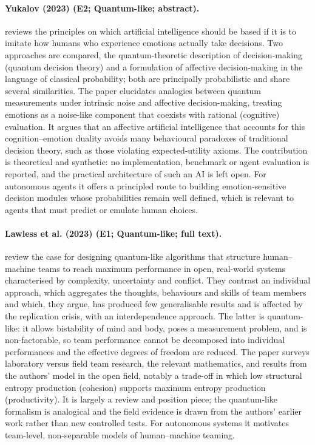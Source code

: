 \documentclass[10pt,a4paper]{article}
\begin{document}
\paragraph{Yukalov (2023) (E2; Quantum-like; abstract).} \citet{Yukalov2023} reviews the principles on which artificial intelligence should be based if it is to imitate how humans who experience emotions actually take decisions. Two approaches are compared, the quantum-theoretic description of decision-making (quantum decision theory) and a formulation of affective decision-making in the language of classical probability; both are principally probabilistic and share several similarities. The paper elucidates analogies between quantum measurements under intrinsic noise and affective decision-making, treating emotions as a noise-like component that coexists with rational (cognitive) evaluation. It argues that an affective artificial intelligence that accounts for this cognition--emotion duality avoids many behavioural paradoxes of traditional decision theory, such as those violating expected-utility axioms. The contribution is theoretical and synthetic: no implementation, benchmark or agent evaluation is reported, and the practical architecture of such an AI is left open. For autonomous agents it offers a principled route to building emotion-sensitive decision modules whose probabilities remain well defined, which is relevant to agents that must predict or emulate human choices.

\paragraph{Lawless et al. (2023) (E1; Quantum-like; full text).} \citet{Lawless2023} review the case for designing quantum-like algorithms that structure human--machine teams to reach maximum performance in open, real-world systems characterised by complexity, uncertainty and conflict. They contrast an individual approach, which aggregates the thoughts, behaviours and skills of team members and which, they argue, has produced few generalisable results and is affected by the replication crisis, with an interdependence approach. The latter is quantum-like: it allows bistability of mind and body, poses a measurement problem, and is non-factorable, so team performance cannot be decomposed into individual performances and the effective degrees of freedom are reduced. The paper surveys laboratory versus field team research, the relevant mathematics, and results from the authors' model in the open field, notably a trade-off in which low structural entropy production (cohesion) supports maximum entropy production (productivity). It is largely a review and position piece; the quantum-like formalism is analogical and the field evidence is drawn from the authors' earlier work rather than new controlled tests. For autonomous systems it motivates team-level, non-separable models of human--machine teaming.
\end{document}
